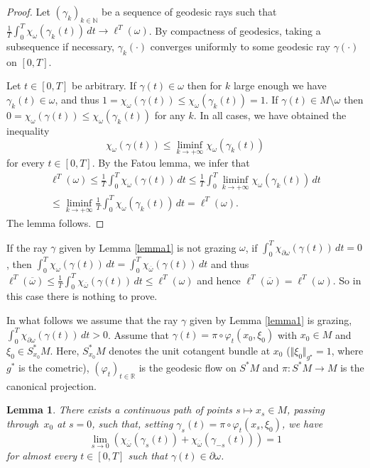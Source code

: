 \documentclass[10pt]{amsart}
\def\R{\mathbb{R}}
\def\N{\mathbb{N}}
\newtheorem{lemma}{Lemma}
\theoremstyle{definition}
\begin{document}
\begin{proof}
Let $(\gamma_k)_{k\in\N}$ be a sequence of geodesic rays such that $\frac{1}{T}\int_0^T\chi_\omega(\gamma_k(t))\, dt \rightarrow \ell^T(\omega)$. By compactness of geodesics, {taking a subsequence if necessary,} $\gamma_k(\cdot)$ converges uniformly to some geodesic ray $\gamma(\cdot)$ on $[0,T]$.

Let $t\in[0,T]$ be arbitrary. If $\gamma(t)\in \omega$ then for $k$ large enough we have $\gamma_k(t)\in \omega$, and thus $1=\chi_{\omega}(\gamma(t))\leq \chi_{\omega}(\gamma_k(t))=1$. If $\gamma(t)\in M\setminus\omega$ then $0=\chi_{\omega}(\gamma(t))\leq \chi_{\omega}(\gamma_k(t))$ for any $k$. In all cases, we have obtained the inequality
\[
\chi_{\omega}(\gamma(t)) \leq \liminf_{k\rightarrow+\infty} \chi_{\omega}(\gamma_k(t))
\]
for every $t\in[0,T]$.
By the Fatou lemma, we infer that
\begin{multline*}
\ell^T(\omega)\leq \frac{1}{T}\int_0^T\chi_\omega(\gamma(t))\, dt \leq \frac{1}{T}\int_0^T \liminf_{k\rightarrow+\infty}\chi_\omega(\gamma_k(t))\, dt \\
\leq \liminf_{k\rightarrow+\infty} \frac{1}{T}\int_0^T \chi_\omega(\gamma_k(t))\, dt = \ell^T(\omega).
\end{multline*}
The lemma follows.
\end{proof}

If the ray $\gamma$ given by Lemma \ref{lemma1} is not grazing $\omega$, \ie if $\int_0^T\chi_{\partial\omega}(\gamma(t))\, dt=0$, then $\int_0^T\chi_{\omega}(\gamma(t))\, dt=\int_0^T\chi_{\overline\omega}(\gamma(t))\, dt$ and thus $\ell^T(\overline\omega)\leq \frac{1}{T} \int_0^T\chi_{\overline\omega}(\gamma(t))\, dt \leq \ell^T(\omega)$ and hence $\ell^T(\overline\omega)=\ell^T(\omega)$. So in this case there is nothing to prove.

In what follows we assume that the ray $\gamma$ given by Lemma \ref{lemma1} is grazing, \ie $\int_0^T\chi_{\partial\omega}(\gamma(t))\, dt>0$. Assume that $\gamma(t) = \pi\circ\varphi_t(x_0,\xi_0)$ with $x_0\in M$ and $\xi_0\in S_{x_0}^*M$. Here, $S_{x_0}^*M$ denotes the unit cotangent bundle at $x_0$ (\ie $\Vert\xi_0\Vert_{g^\star}=1$, where $g^*$ is the cometric), $(\varphi_t)_{t\in\R}$ is the geodesic flow on $S^*M$ and $\pi:S^*M\rightarrow M$ is the canonical projection.

\begin{lemma}\label{lemma2}
There exists a continuous path of points $s\mapsto x_s\in M$, passing through~$x_0$ at $s=0$, such that, setting $\gamma_s(t) = \pi\circ\varphi_t(x_s,\xi_0)$, we have
\begin{equation} \label{transverse}
\lim_{s\rightarrow 0} \left( \chi_{\overline\omega}(\gamma_s(t)) + \chi_{\overline\omega}(\gamma_{-s}(t)) \right) = 1
\end{equation}
for almost every $t\in[0,T]$ such that $\gamma(t)\in\partial\omega$.
\end{lemma}
\end{document}
